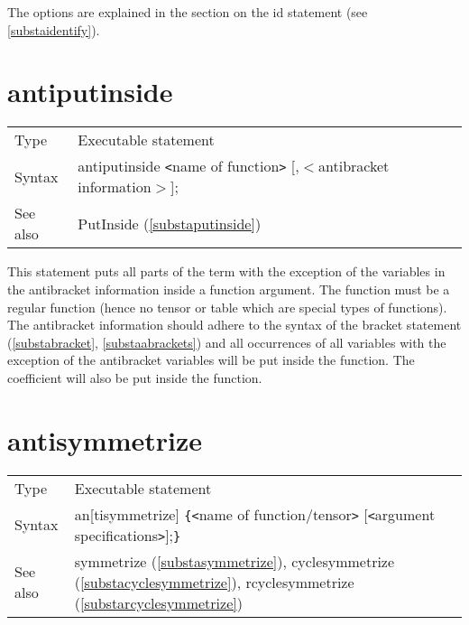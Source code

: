 \noindent The options are explained in the section on the id statement (see 
\ref{substaidentify}). \vspace{10mm}


\section{antiputinside}
\label{substaantiputinside}

\noindent \begin{tabular}{ll}
Type & Executable statement\\
Syntax & antiputinside {\tt<}name of function{\tt>} [,$<$antibracket information$>$];
\\ See also & PutInside (\ref{substaputinside})
\end{tabular}\vspace{4mm}

\noindent This statement puts all parts of the term 
with the exception of the variables in the antibracket information inside a 
function argument. The function must be a regular function (hence no tensor 
or table which are special types of functions). The 
antibracket information should adhere to the syntax of 
the bracket statement (\ref{substabracket}, \ref{substaabrackets}) and all 
occurrences of all variables with the exception of the antibracket 
variables will be put inside the function. The coefficient will also be put 
inside the function.
\vspace{10mm}


\section{antisymmetrize}
\label{substaantisymmetrize}

\noindent \begin{tabular}{ll}
Type & Executable statement\\
Syntax & an[tisymmetrize] \verb:{:{\tt<}name of function/tensor{\tt>}
         [{\tt<}argument specifications{\tt>}];\verb:}: \\
See also & symmetrize (\ref{substasymmetrize}), cyclesymmetrize 
(\ref{substacyclesymmetrize}), rcyclesymmetrize (\ref{substarcyclesymmetrize})
\end{tabular} \vspace{4mm}

